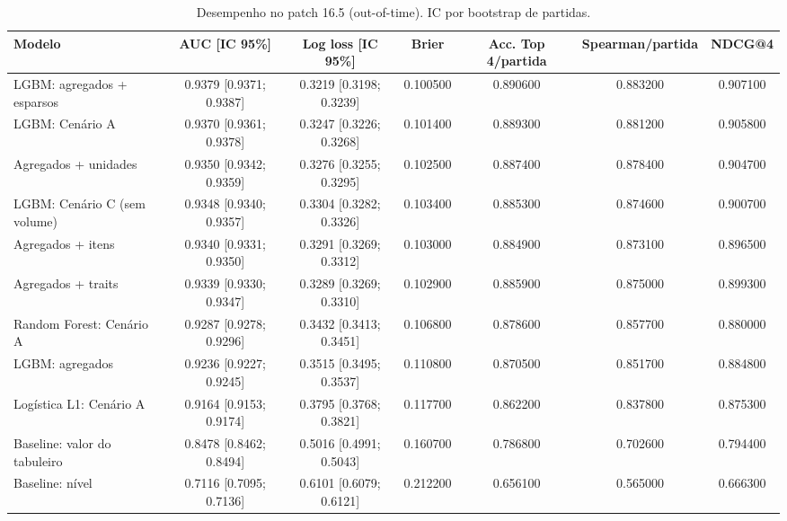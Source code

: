 \begin{table}[htbp]
\caption{Desempenho no patch 16.5 (out-of-time). IC por bootstrap de partidas.}
\label{tab:metricas}
\centering
\small
\begin{tabular}{lcccccc}
\toprule
Modelo & AUC [IC 95\%] & Log loss [IC 95\%] & Brier & Acc. Top 4/partida & Spearman/partida & NDCG@4 \\
\midrule
LGBM: agregados + esparsos & 0.9379 [0.9371; 0.9387] & 0.3219 [0.3198; 0.3239] & 0.100500 & 0.890600 & 0.883200 & 0.907100 \\
LGBM: Cenário A & 0.9370 [0.9361; 0.9378] & 0.3247 [0.3226; 0.3268] & 0.101400 & 0.889300 & 0.881200 & 0.905800 \\
Agregados + unidades & 0.9350 [0.9342; 0.9359] & 0.3276 [0.3255; 0.3295] & 0.102500 & 0.887400 & 0.878400 & 0.904700 \\
LGBM: Cenário C (sem volume) & 0.9348 [0.9340; 0.9357] & 0.3304 [0.3282; 0.3326] & 0.103400 & 0.885300 & 0.874600 & 0.900700 \\
Agregados + itens & 0.9340 [0.9331; 0.9350] & 0.3291 [0.3269; 0.3312] & 0.103000 & 0.884900 & 0.873100 & 0.896500 \\
Agregados + traits & 0.9339 [0.9330; 0.9347] & 0.3289 [0.3269; 0.3310] & 0.102900 & 0.885900 & 0.875000 & 0.899300 \\
Random Forest: Cenário A & 0.9287 [0.9278; 0.9296] & 0.3432 [0.3413; 0.3451] & 0.106800 & 0.878600 & 0.857700 & 0.880000 \\
LGBM: agregados & 0.9236 [0.9227; 0.9245] & 0.3515 [0.3495; 0.3537] & 0.110800 & 0.870500 & 0.851700 & 0.884800 \\
Logística L1: Cenário A & 0.9164 [0.9153; 0.9174] & 0.3795 [0.3768; 0.3821] & 0.117700 & 0.862200 & 0.837800 & 0.875300 \\
Baseline: valor do tabuleiro & 0.8478 [0.8462; 0.8494] & 0.5016 [0.4991; 0.5043] & 0.160700 & 0.786800 & 0.702600 & 0.794400 \\
Baseline: nível & 0.7116 [0.7095; 0.7136] & 0.6101 [0.6079; 0.6121] & 0.212200 & 0.656100 & 0.565000 & 0.666300 \\
\bottomrule
\end{tabular}
\end{table}
